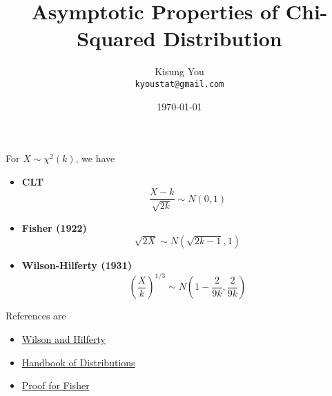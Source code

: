 \documentclass[fontsize=12pt]{article}
\title{Asymptotic Properties of Chi-Squared Distribution}
\author{
	Kisung You\\
	\texttt{kyoustat@gmail.com}
}
\date{\today}
\begin{document}
\maketitle

For $X \sim \chi^2 (k)$, we have
\begin{itemize}
	\item \textbf{CLT}
	\begin{equation*}
	\frac{X - k}{\sqrt{2k}} \sim N(0,1)
	\end{equation*}
	\item \textbf{Fisher (1922)}
	\begin{equation*}
	\sqrt{2X} \sim N(\sqrt{2k-1}, 1)
	\end{equation*}
	\item \textbf{Wilson-Hilferty (1931)}
	\begin{equation*}
	\left({\frac{X}{k}}\right)^{1/3} \sim N(1-\frac{2}{9k}, \frac{2}{9k})
	\end{equation*}
\end{itemize}

References are 
\begin{itemize}
	\item \href{https://www.ncbi.nlm.nih.gov/pmc/articles/PMC1076144/pdf/pnas01728-0064.pdf}{Wilson and Hilferty}
	\item \href{http://inspirehep.net/record/1389910/files/suf9601.pdf}{Handbook of Distributions}
	\item \href{https://stats.stackexchange.com/questions/258300/approximation-of-chi-squared-distribution-quantiles-by-means-of-the-standard-nor}{Proof for Fisher}
\end{itemize}



\end{document}
